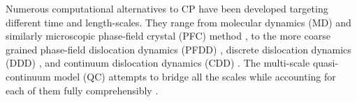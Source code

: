 \documentclass[CRPHYS,Unicode,manuscript]{cedram}
\begin{document}




Numerous computational  alternatives to CP   have been developed  targeting different time and length-scales. They range     from  molecular dynamics (MD) \cite{Niiyama2015-gv,Zepeda-Ruiz2017-gu} and   similarly microscopic  phase-field crystal (PFC) method \cite{Salvalaglio2020-eb,Chan2010-ha},  to the more coarse grained   phase-field dislocation dynamics    (PFDD) \cite{Finel2000-um,Koslowski2002-dn,Hunter2011-vp},   discrete dislocation dynamics (DDD) \cite{Vattre2014-be,Ispanovity2014-ra,El-Awady2016-ea,Bertin2019-bb}, and   continuum dislocation dynamics (CDD) \cite{Varadhan2006-xb,Hochrainer2014-sk,El-Azab2020-fu}. The multi-scale   quasi-continuum  model (QC)  attempts to bridge all the scales while accounting for  each of them fully comprehensibly \cite{Shenoy1999-gh,Miller2002-pa}. 
\end{document}

